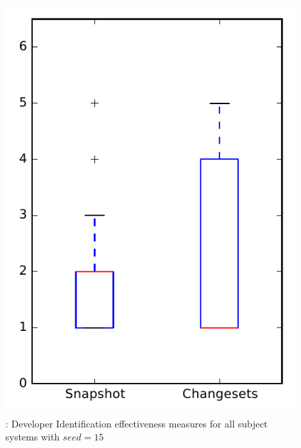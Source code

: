 
\begin{figure}
\centering
\includegraphics[height=0.4\textheight]{figures/dit_seed/rq1_overview_15}
\caption{\rtwo: Developer Identification effectiveness measures for all subject systems with $seed=15$}
\label{fig:dit_seed:rq1:overview}
\end{figure}
